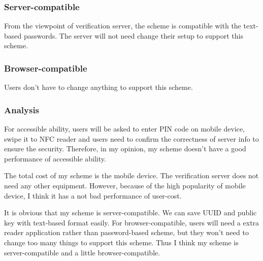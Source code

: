 \begin{CJK}{Bg5}{bsmi}
\subsubsection{Server-compatible}

From the viewpoint of verification server, the scheme is compatible with the text-based passwords. The server will not need change their setup to support this scheme. 

\subsubsection{Browser-compatible}

Users don't have to change anything to support this scheme. 

\subsubsection{Analysis}

For accessible ability, users will be asked to enter PIN code on mobile device, swipe it to NFC reader and users need to confirm the correctness of server info to ensure the security. Therefore, in my opinion, my scheme doesn't have a good performance of accessible ability.

The total cost of my scheme is the mobile device. The verification server does not need any other equipment. However, because of the high popularity of mobile device, I think it has a not bad performance of user-cost.

It is obvious that my scheme is server-compatible. We can save UUID and public key with text-based format easily. For browser-compatible, users will need a extra reader application rather than password-based scheme, but they won't need to change too many things to support this scheme. Thus I think my scheme is server-compatible and a little browser-compatible. 

\end{CJK}